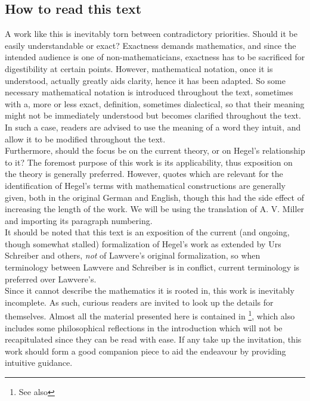 \documentclass{article}
\begin{document}
\subsection{How to read this text}
A work like this is inevitably torn between contradictory priorities. Should it be easily understandable or exact? Exactness demands mathematics, and since the intended audience is one of non-mathematicians, exactness has to be sacrificed for digestibility at certain points. However, mathematical notation, once it is understood, actually greatly aids clarity, hence it has been adapted. So some necessary mathematical notation is introduced throughout the text, sometimes with a, more or less exact, definition, sometimes dialectical, so that their meaning might not be immediately understood but becomes clarified throughout the text. In such a case, readers are advised to use the meaning of a word they intuit, and allow it to be modified throughout the text. \\

Furthermore, should the focus be on the current theory, or on Hegel's relationship to it? The foremost purpose of this work is its applicability, thus exposition on the theory is generally preferred. However, quotes which are relevant for the identification of Hegel's terms with mathematical constructions are generally given, both in the original German and English, though this had the side effect of increasing the length of the work. We will be using the translation of A. V. Miller and importing its paragraph numbering. \\

It should be noted that this text is an exposition of the current (and ongoing, though somewhat stalled) formalization of Hegel's work as extended by Urs Schreiber and others, \emph{not} of Lawvere's original formalization, so when terminology between Lawvere and Schreiber is in conflict, current terminology is preferred over Lawvere's. \\

Since it cannot describe the mathematics it is rooted in, this work is inevitably incomplete. As such,  curious readers are invited to look up the details for themselves. Almost all the material presented here is contained in \cite{nlabsol}\footnote{See also }, which also includes some philosophical reflections in the introduction which will not be recapitulated since they can be read with ease. If any take up the invitation, this work should form a good companion piece to aid the endeavour by providing intuitive guidance. 
\end{document}

